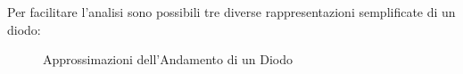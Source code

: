 \documentclass{article}
\numberwithin{equation}{subsection}
\begin{document}
Per facilitare l'analisi sono possibili tre diverse rappresentazioni semplificate di un diodo:
\begin{figure}[H]%
    \centering
    \quad
    \quad
    \caption{Approssimazioni dell'Andamento di un Diodo}
    \label{fig:approssimazioni-diodo}
\end{figure}
\end{document}
